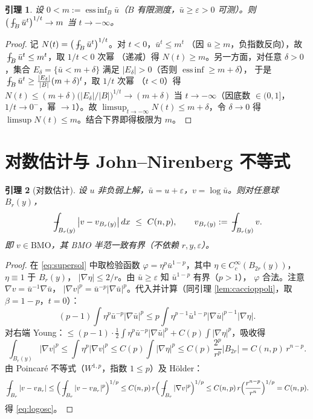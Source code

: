 \documentclass[11pt]{ctexart}
\newcommand{\fint}{\,\rlap{$-$}\!\int}
\DeclareMathOperator*{\essinf}{ess\,inf}
\newcommand{\ub}{\bar{u}}
\newcommand{\eps}{\varepsilon}
\theoremstyle{plain}
\newtheorem{lemma}{引理}
\theoremstyle{definition}
\begin{document}
\begin{lemma}\label{lem:limit}
设 $0<m:=\essinf_{B}\ub$（$B$ 有限测度，$\ub\ge\eps>0$ 可测）。则
$\big(\fint_B\ub^{t}\big)^{1/t}\to m$ 当 $t\to-\infty$。
\end{lemma}
\begin{proof}
记 $N(t)=\big(\fint_B\ub^{t}\big)^{1/t}$。对 $t<0$，$\ub^{t}\le m^{t}$
（因 $\ub\ge m$，负指数反向），故 $\fint_B\ub^t\le m^t$，取 $1/t<0$ 次幂
（递减）得 $N(t)\ge m$。另一方面，对任意 $\delta>0$，集合
$E_\delta=\{\ub<m+\delta\}$ 满足 $|E_\delta|>0$（否则 $\essinf\ge m+\delta$），
于是 $\fint_B\ub^t\ge\frac{|E_\delta|}{|B|}(m+\delta)^t$，取 $1/t$ 次幂
（$t<0$）得
$N(t)\le(m+\delta)\big(|E_\delta|/|B|\big)^{1/t}\to(m+\delta)$
当 $t\to-\infty$（因底数 $\in(0,1]$，$1/t\to0^-$，幂 $\to1$）。故
$\limsup_{t\to-\infty}N(t)\le m+\delta$，令 $\delta\to0$ 得
$\limsup N(t)\le m$。结合下界即得极限为 $m$。
\end{proof}

\section{对数估计与 John--Nirenberg 不等式}

\begin{lemma}[对数估计]\label{lem:log}
设 $u$ 非负弱上解，$\ub=u+\eps$，$v=\log\ub$。则对任意球 $B_r(y)$，
\begin{equation}\label{eq:logosc}
\fint_{B_r(y)}\big|v-v_{B_r(y)}\big|\,dx\ \le\ C(n,p),
\qquad v_{B_r(y)}:=\fint_{B_r(y)}v .
\end{equation}
即 $v\in\mathrm{BMO}$，其 BMO 半范一致有界（不依赖 $r,y,\eps$）。
\end{lemma}

\begin{proof}
在 \eqref{eq:supersol} 中取检验函数 $\varphi=\eta^p\ub^{1-p}$，其中
$\eta\in C_c^\infty(B_{2r}(y))$，$\eta\equiv1$ 于 $B_r(y)$，
$|\nabla\eta|\le2/r$。由 $\ub\ge\eps$ 知 $\ub^{1-p}$ 有界（$p>1$），
$\varphi$ 合法。注意 $\nabla v=\ub^{-1}\nabla\ub$，
$|\nabla v|^p=\ub^{-p}|\nabla\ub|^p$。代入并计算（同引理
\ref{lem:caccioppoli}，取 $\beta=1-p$，$t=0$）：
\[
(p-1)\int\eta^p\ub^{-p}|\nabla\ub|^p
\le p\int\eta^{p-1}\ub^{1-p}|\nabla\ub|^{p-1}|\nabla\eta|.
\]
对右端 Young：$\le(p-1)\cdot\tfrac12\int\eta^p\ub^{-p}|\nabla\ub|^p
+C(p)\int|\nabla\eta|^p$，吸收得
\[
\int_{B_r(y)}|\nabla v|^p
\le\int\eta^p|\nabla v|^p\le C(p)\int|\nabla\eta|^p
\le C(p)\,\frac{2^p}{r^p}|B_{2r}|=C(n,p)\,r^{n-p}.
\]
由 Poincaré 不等式（$W^{1,p}$，指数 $1\le p$）及 Hölder：
\[
\fint_{B_r}|v-v_{B_r}|
\le\Big(\fint_{B_r}|v-v_{B_r}|^p\Big)^{1/p}
\le C(n,p)\,r\Big(\fint_{B_r}|\nabla v|^p\Big)^{1/p}
\le C(n,p)\,r\Big(\frac{r^{n-p}}{r^n}\Big)^{1/p}=C(n,p).
\]
得 \eqref{eq:logosc}。
\end{proof}
\end{document}
